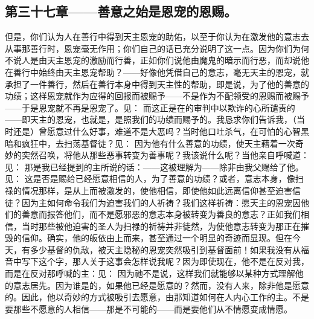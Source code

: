
\subsection{第三十七章——善意之始是恩宠的恩赐。}

但是，你们认为人在善行中得到天主恩宠的助佑，以至于你认为在激发他的意志去从事那善行时，恩宠毫无作用；你们自己的话已充分说明了这一点。因为你们为何不说人是由天主恩宠的激励而行善，正如你们说他由魔鬼的暗示而行恶，而却说他在善行中始终由天主恩宠帮助？——好像他凭借自己的意志，毫无天主的恩宠，就承担了一件善行，然后在善行本身中得到天主性的帮助，即是说，为了他的善意的功绩；这样恩宠就作为应得的回报而被赐予——不是作为不配领受的恩赐而被赐予——于是恩宠就不再是恩宠了。见： 而这正是在的审判中以欺诈的心所谴责的——即天主的恩宠，也就是，是照我们的功绩而赐予的。我恳求你们告诉我，（当时还是）曾愿意过什么好事，难道不是大恶吗？当时他口吐杀气，在可怕的心智黑暗和疯狂中，去扫荡基督徒？见： 因为他有什么善意的功绩，使天主藉着一次奇妙的突然召唤，将他从那些恶事转变为善事呢？我该说什么呢？当他亲自呼喊道：见： 那是我已经提到的主所说的话：——这被理解为——除非由我父赐给了他。见： 这是否是赐给已经愿意相信的人，为了善意的功绩？或者，意志本身，像扫禄的情况那样，是从上而被激发的，使他相信，即使他如此远离信仰甚至迫害信徒？因为主如何命令我们为迫害我们的人祈祷？我们这样祈祷：愿天主的恩宠因他们的善意而报答他们，而不是愿邪恶的意志本身被转变为善良的意志？正如我们相信，当时那些被他迫害的圣人为扫禄的祈祷并非徒然，为使他意志转变为那正在摧毁的信仰。确实，他的皈依由上而来，甚至通过一个明显的奇迹而显现。但在今天，有多少基督的仇敌，被天主隐秘的恩宠突然吸引到基督面前！如果我没有从福音中写下这个字，那人关于这事会怎样说我呢？因为即使现在，他不是在反对我，而是在反对那呼喊的主：见： 因为祂不是说，这样我们就能够以某种方式理解他的意志居先。因为谁是的，如果他已经是愿意的？然而，没有人来，除非他是愿意的。因此，他以奇妙的方式被吸引去愿意，由那知道如何在人内心工作的主。不是要那些不愿意的人相信——那是不可能的——而是要他们从不情愿变成情愿。\par


